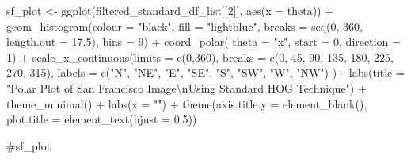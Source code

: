 \documentclass[
  letterpaper,
  DIV=11,
  numbers=noendperiod]{scrreprt}
\newenvironment{Shaded}{\begin{snugshade}}{\end{snugshade}}
\newcommand{\AttributeTok}[1]{\textcolor[rgb]{0.40,0.45,0.13}{#1}}
\newcommand{\CommentTok}[1]{\textcolor[rgb]{0.37,0.37,0.37}{#1}}
\newcommand{\DecValTok}[1]{\textcolor[rgb]{0.68,0.00,0.00}{#1}}
\newcommand{\FloatTok}[1]{\textcolor[rgb]{0.68,0.00,0.00}{#1}}
\newcommand{\FunctionTok}[1]{\textcolor[rgb]{0.28,0.35,0.67}{#1}}
\newcommand{\NormalTok}[1]{\textcolor[rgb]{0.00,0.23,0.31}{#1}}
\newcommand{\OtherTok}[1]{\textcolor[rgb]{0.00,0.23,0.31}{#1}}
\newcommand{\SpecialCharTok}[1]{\textcolor[rgb]{0.37,0.37,0.37}{#1}}
\newcommand{\StringTok}[1]{\textcolor[rgb]{0.13,0.47,0.30}{#1}}
\begin{document}
\begin{Shaded}
\begin{Highlighting}[]
\NormalTok{sf\_plot }\OtherTok{\textless{}{-}}
  \FunctionTok{ggplot}\NormalTok{(filtered\_standard\_df\_list[[}\DecValTok{2}\NormalTok{]], }
         \FunctionTok{aes}\NormalTok{(}\AttributeTok{x =}\NormalTok{ theta)) }\SpecialCharTok{+}
  \FunctionTok{geom\_histogram}\NormalTok{(}\AttributeTok{colour =} \StringTok{"black"}\NormalTok{, }
                 \AttributeTok{fill =} \StringTok{"lightblue"}\NormalTok{, }
                 \AttributeTok{breaks =} \FunctionTok{seq}\NormalTok{(}\DecValTok{0}\NormalTok{, }\DecValTok{360}\NormalTok{, }\AttributeTok{length.out =} \FloatTok{17.5}\NormalTok{),}
                 \AttributeTok{bins =} \DecValTok{9}\NormalTok{) }\SpecialCharTok{+}
  \FunctionTok{coord\_polar}\NormalTok{(}
    \AttributeTok{theta =} \StringTok{"x"}\NormalTok{, }\AttributeTok{start =} \DecValTok{0}\NormalTok{, }\AttributeTok{direction =} \DecValTok{1}\NormalTok{) }\SpecialCharTok{+}
  \FunctionTok{scale\_x\_continuous}\NormalTok{(}\AttributeTok{limits =} \FunctionTok{c}\NormalTok{(}\DecValTok{0}\NormalTok{,}\DecValTok{360}\NormalTok{),}
    \AttributeTok{breaks =} \FunctionTok{c}\NormalTok{(}\DecValTok{0}\NormalTok{, }\DecValTok{45}\NormalTok{, }\DecValTok{90}\NormalTok{, }\DecValTok{135}\NormalTok{, }\DecValTok{180}\NormalTok{, }\DecValTok{225}\NormalTok{, }\DecValTok{270}\NormalTok{, }\DecValTok{315}\NormalTok{), }
    \AttributeTok{labels =} \FunctionTok{c}\NormalTok{(}\StringTok{"N"}\NormalTok{, }\StringTok{"NE"}\NormalTok{, }\StringTok{"E"}\NormalTok{, }\StringTok{"SE"}\NormalTok{, }\StringTok{"S"}\NormalTok{, }\StringTok{"SW"}\NormalTok{, }\StringTok{"W"}\NormalTok{, }\StringTok{"NW"}\NormalTok{)}
\NormalTok{  )}\SpecialCharTok{+}
  \FunctionTok{labs}\NormalTok{(}\AttributeTok{title =} \StringTok{"Polar Plot of San Francisco Image}\SpecialCharTok{\textbackslash{}n}\StringTok{Using Standard HOG Technique"}\NormalTok{) }\SpecialCharTok{+}
  \FunctionTok{theme\_minimal}\NormalTok{() }\SpecialCharTok{+}
  \FunctionTok{labs}\NormalTok{(}\AttributeTok{x =} \StringTok{""}\NormalTok{) }\SpecialCharTok{+}
  \FunctionTok{theme}\NormalTok{(}\AttributeTok{axis.title.y =} \FunctionTok{element\_blank}\NormalTok{(),}
        \AttributeTok{plot.title =} \FunctionTok{element\_text}\NormalTok{(}\AttributeTok{hjust =} \FloatTok{0.5}\NormalTok{))}

\CommentTok{\#sf\_plot}
\end{Highlighting}
\end{Shaded}
\end{document}
